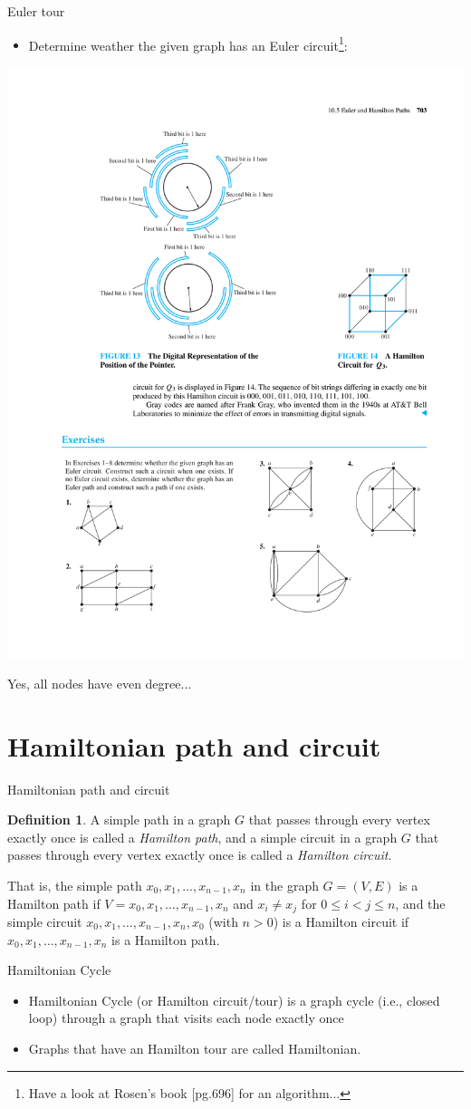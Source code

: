 \documentclass{beamer}
\theoremstyle{definition}
\newtheorem{defn}{Definition}[section]
\begin{document}
\begin{frame}{Euler tour}
   \begin{itemize}
        \item Determine weather the given graph has an Euler circuit\footnote{\tiny Have a look at Rosen's book [pg.696] for an algorithm...}:
    \end{itemize}
    \centering \includegraphics[trim={12.2cm 2cm 5.2cm 22.2cm},clip,width=.45\linewidth]{p703}
    
    Yes, all nodes have even degree...
\end{frame}

\section{Hamiltonian path and circuit}

\begin{frame}{Hamiltonian path and circuit}
    \begin{defn}
        A simple path in a graph $G$ that passes through every vertex exactly once is called a \textit{Hamilton path}, and a simple circuit in a graph $G$ that passes through every vertex exactly once is called a \textit{Hamilton circuit}. 
        
        That is, the simple path $x_0, x_1, \ldots, x_{n−1}, x_n$ in the graph $G = (V, E)$ is a Hamilton path if $V = {x_0, x_1, \ldots, x_{n−1}, x_n}$ and $x_i \neq x_j$ for $0 \leq i < j \leq n$, and the simple circuit $x_0, x_1, \ldots, x_{n−1}, x_n, x_0$ (with $n > 0$) is a Hamilton circuit if $x_0, x_1, \ldots, x_{n−1}, x_n$ is a Hamilton path.
    \end{defn}
\end{frame}

\begin{frame}{Hamiltonian Cycle}
   \begin{itemize}
        \item Hamiltonian Cycle (or Hamilton circuit/tour) is a graph cycle (i.e., closed loop) through a graph that visits each node exactly once 
        \item Graphs that have an Hamilton tour are called Hamiltonian. 
    \end{itemize}
\end{frame}
\end{document}
